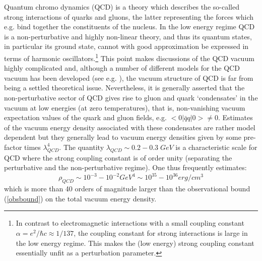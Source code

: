 \documentclass[12pt]{article}
\begin{document}
Quantum chromo dynamics (QCD) is a theory which describes the
so-called strong interactions of quarks and gluons, the latter
representing the forces which e.g. bind together the constituents of
the nucleus.  In the low energy regime QCD is a non-perturbative and
highly non-linear theory, and thus its quantum states, in particular
its ground state, cannot with good approximation be expressed in terms
of harmonic oscillators.\footnote{In contrast to electromagnetic
interactions with a small coupling constant $\alpha = e^2 / \hbar c
\approx 1/137$, the coupling constant for strong interactions is large
in the low energy regime.  This makes the (low energy) strong coupling
constant essentially unfit as a perturbation parameter.}  This point
makes discussions of the QCD vacuum highly complicated and, although a
number of different models for the QCD vacuum has been developed (see
e.g. \cite{shuryak88}), the vacuum structure of QCD is far from being
a settled theoretical issue. Nevertheless, it is generally asserted
that the non-perturbative sector of QCD gives rise to gluon and quark
`condensates' in the vacuum at low energies (at zero temperatures),
that is, non-vanishing vacuum expectation values of the quark and
gluon fields, e.g.  $<0 | \bar{q} q| 0> \neq 0$.  Estimates of the
vacuum energy density associated with these condensates are rather
model dependent but they generally lead to vacuum energy densities
given by some pre-factor times $\lambda_{QCD}^4$. The quantity
$\lambda_{QCD} \sim 0.2-0.3 \; GeV$ is a characteristic scale for QCD
where the strong coupling constant is of order unity (separating the
perturbative and the non-perturbative regime).  One thus frequently
estimates:
$$
\rho_{QCD} \sim 10^{-3}-10^{-2} GeV^4 \sim 10^{35}-10^{36} erg/cm^3 
$$
which is more than 40 orders of magnitude larger than the observational
bound (\ref{obsbound}) on the total vacuum energy density. 
\end{document}
